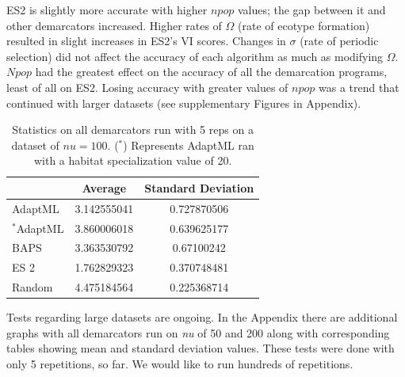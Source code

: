 ES2 is slightly more accurate with higher $npop$ values; the gap between it and other demarcators increased.
Higher rates of $\Omega$ (rate of ecotype formation) resulted in slight increases in ES2's VI scores.
Changes in $\sigma$ (rate of periodic selection) did not affect the accuracy of each algorithm as much as modifying $\Omega$.
$Npop$ had the greatest effect on the accuracy of all the demarcation programs, least of all on ES2.
Losing accuracy with greater values of $npop$ was a trend that continued with larger datasets (see supplementary Figures in Appendix).

\begin{table}[h!]
    \begin{tabular}{l|cc}
    ~                    & Average     & Standard Deviation \\ \hline
    AdaptML              & 3.142555041 & 0.727870506        \\
    $^\ast$AdaptML              & 3.860006018 & 0.639625177        \\
    BAPS                 & 3.363530792 & 0.67100242         \\
    ES 2 & 1.762829323 & 0.370748481        \\
    Random               & 4.475184564 & 0.225368714        \\
    \end{tabular}
    \caption[Statistics on all demarcators on $nu=100$.]{Statistics on all demarcators run with 5 reps on a dataset of $nu=100$. ($^\ast$) Represents AdaptML ran with a habitat specialization value of 20. }
        \label{tab:100Allmean}
\end{table}

Tests regarding large datasets are ongoing.
In the Appendix there are additional graphs with all demarcators run on \emph{nu} of 50 and 200 along with corresponding tables showing mean and standard deviation values.
These tests were done with only 5 repetitions, so far.
We would like to run hundreds of repetitions.

